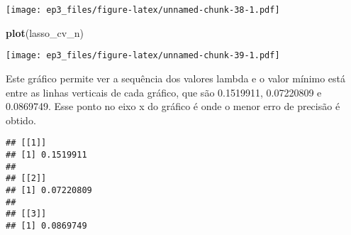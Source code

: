 \documentclass[]{article}
\newenvironment{Shaded}{\begin{snugshade}}{\end{snugshade}}
\newcommand{\CommentTok}[1]{\textcolor[rgb]{0.56,0.35,0.01}{\textit{#1}}}
\newcommand{\DataTypeTok}[1]{\textcolor[rgb]{0.13,0.29,0.53}{#1}}
\newcommand{\DecValTok}[1]{\textcolor[rgb]{0.00,0.00,0.81}{#1}}
\newcommand{\KeywordTok}[1]{\textcolor[rgb]{0.13,0.29,0.53}{\textbf{#1}}}
\newcommand{\NormalTok}[1]{#1}
\newcommand{\OperatorTok}[1]{\textcolor[rgb]{0.81,0.36,0.00}{\textbf{#1}}}
\newcommand{\OtherTok}[1]{\textcolor[rgb]{0.56,0.35,0.01}{#1}}
\newcommand{\StringTok}[1]{\textcolor[rgb]{0.31,0.60,0.02}{#1}}
\begin{document}
\texttt{[image: ep3\_files/figure-latex/unnamed-chunk-38-1.pdf]}

\begin{Shaded}
\begin{Highlighting}[]
\KeywordTok{plot}\NormalTok{(lasso_cv_n)}
\end{Highlighting}
\end{Shaded}

\texttt{[image: ep3\_files/figure-latex/unnamed-chunk-39-1.pdf]}

Este gráfico permite ver a sequência dos valores lambda e o valor mínimo
está entre as linhas verticais de cada gráfico, que são 0.1519911,
0.07220809 e 0.0869749. Esse ponto no eixo x do gráfico é onde o menor
erro de precisão é obtido.

\begin{Shaded}
\end{Shaded}

\begin{verbatim}
## [[1]]
## [1] 0.1519911
## 
## [[2]]
## [1] 0.07220809
## 
## [[3]]
## [1] 0.0869749
\end{verbatim}

\begin{Shaded}
\end{Shaded}
\end{document}
